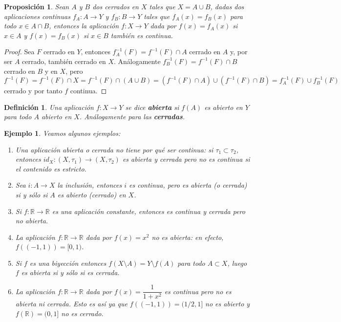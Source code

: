 \documentclass[12pt]{article}
\newtheorem{proposition}[theorem]{Proposición}
\newtheorem{definition}[theorem]{Definición}
\newtheorem{example}{Ejemplo}[theorem]
\begin{document}
\begin{proposition}Sean $A$ y $B$ dos cerrados en $X$ tales que $X = A \cup B$, dadas dos aplicaciones continuas $f_A \colon A \longrightarrow Y$ y $f_B \colon B \longrightarrow Y$ tales que $f_A(x) = f_B(x)$ para todo $x \in A \cap B$, entonces la aplicación $f \colon X \longrightarrow Y$ dada por $f(x) = f_A(x)$ si $x \in A$ y $f(x) = f_B(x)$ si $x \in B$ también es continua.
\end{proposition}
\begin{proof}
Sea $F$ cerrado en $Y$, entonces $f_A^{-1}(F) = f^{-1}(F) \cap A$ cerrado en $A$ y, por ser $A$ cerrado, también cerrado en $X$. Análogamente $f_B ^{-1} (F) = f^{-1}(F) \cap B$ cerrado en $B$ y en $X$, pero $f^{-1}(F) = f^{-1}(F) \cap X = f^{-1}(F) \cap (A\cup B) = (f^{-1}(F) \cap A)\cup (f^{-1}(F) \cap B) = f_A^{-1}(F) \cup f^{-1}_B(F)$ cerrado y por tanto $f$ continua.

\end{proof}

\begin{definition}Una aplicación $f \colon X \longrightarrow Y$ se dice \textbf{abierta} si $f(A)$ es abierto en $Y$ para todo $A$ abierto en $X$. Análogamente para las \textbf{cerradas}.
\end{definition}

\begin{example}Veamos algunos ejemplos:
\begin{enumerate}
\item Una aplicación abierta o cerrada no tiene por qué ser continua: si $\tau_1 \subset \tau_2$, entonces $id_X \colon (X, \tau_1) \longrightarrow (X, \tau_2)$ es abierta y cerrada pero no es continua si el contenido es estricto.
\item Sea $i \colon A \longrightarrow X$ la inclusión, entonces $i$ es continua, pero es abierta (o cerrada) si y sólo si $A$ es abierto (cerrado) en $X$.
\item Si $f \colon \mathbb{R} \longrightarrow \mathbb{R}$ es una aplicación constante, entonces es continua y cerrada pero no abierta.
\item La aplicación $f\colon \mathbb{R} \longrightarrow \mathbb{R}$ dada por $f(x) = x^2$ no es abierta: en efecto, $f((-1,1)) = [0,1)$.
\item Si $f$ es una biyección entonces $f(X \setminus A) = Y \setminus f(A)$ para todo $A \subset X$, luego $f$ es abierta si y sólo si es cerrada.
\item La aplicación $f \colon \mathbb{R} \longrightarrow \mathbb{R}$ dada por $f(x) = \dfrac{1}{1+x^2}$ es continua pero no es abierta ni cerrada. Esto es así ya que $f((-1,1))=(1/2,1]$ no es abierto y $f(\mathbb{R}) = (0,1]$ no es cerrado.
\end{enumerate}
\end{example}
\end{document}
